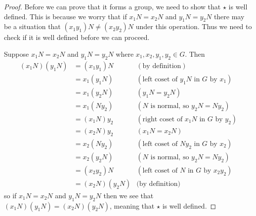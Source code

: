\begin{proof}
    Before we can prove that it forms a group, we need to show that $\star$ is well defined. This is because we worry that if $x_1N = x_2N$ and $y_1N = y_2N$ there may be a situation that $(x_1y_1)N \neq (x_2y_2)N$ under this operation. Thus we need to check if it is well defined before we can proceed.

    Suppose $x_1N = x_2N$ and $y_1N = y_2N$ where $x_1, x_2, y_1, y_2 \in G$. Then
    \begin{align*}
        (x_1N)(y_1N) &= (x_1y_1)N & (\text{by definition})\\
        &= x_1(y_1N) & (\text{left coset of } y_1N \text{ in } G \text{ by } x_1)\\
        &= x_1(y_2N) & (y_1N = y_2N)\\
        &= x_1(Ny_2) & (N \text{ is normal, so } y_2N=Ny_2)\\
        &= (x_1N)y_2 & (\text{right coset of } x_1N \text{ in } G \text{ by } y_2)\\
        &= (x_2N)y_2 & (x_1N = x_2N)\\
        &= x_2(Ny_2) & (\text{left coset of } Ny_2 \text{ in } G \text{ by } x_2)\\
        &= x_2(y_2N) & (N \text{ is normal, so } y_2N=Ny_2)\\
        &= (x_2y_2)N & (\text{left coset of } N \text{ in } G \text{ by } x_2y_2)\\
        &= (x_2N)(y_2N) & \text{(by definition)}
    \end{align*}
    so if $x_1N = x_2N$ and $y_1N = y_2N$ then we see that $(x_1N)(y_1N) = (x_2N)(y_2N)$, meaning that $\star$ is well defined.


\end{proof}
